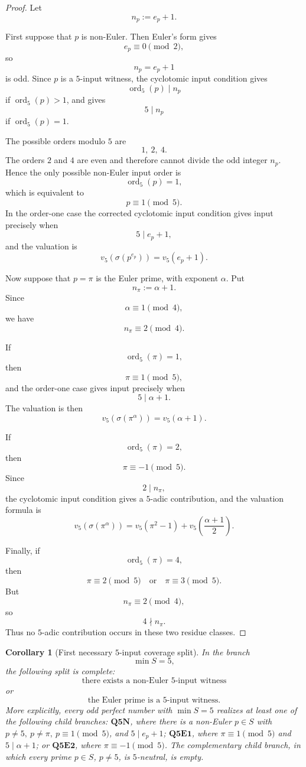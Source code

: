 \documentclass[11pt]{article}
\newtheorem{corollary}[theorem]{Corollary}
\theoremstyle{definition}
\theoremstyle{remark}
\DeclareMathOperator{\ord}{ord}
\begin{document}
\begin{proof}
Let
\[
  n_p:=e_p+1.
\]

First suppose that $p$ is non-Euler.  Then Euler's form gives
\[
  e_p\equiv0\pmod2,
\]
so
\[
  n_p=e_p+1
\]
is odd.  Since $p$ is a $5$-input witness, the cyclotomic input condition gives
\[
  \ord_5(p)\mid n_p
\]
if $\ord_5(p)>1$, and gives
\[
  5\mid n_p
\]
if $\ord_5(p)=1$.

The possible orders modulo $5$ are
\[
  1,\ 2,\ 4.
\]
The orders $2$ and $4$ are even and therefore cannot divide the odd integer
$n_p$.  Hence the only possible non-Euler input order is
\[
  \ord_5(p)=1,
\]
which is equivalent to
\[
  p\equiv1\pmod5.
\]
In the order-one case the corrected cyclotomic input condition gives input
precisely when
\[
  5\mid e_p+1,
\]
and the valuation is
\[
  v_5(\sigma(p^{e_p}))=v_5(e_p+1).
\]

Now suppose that $p=\pi$ is the Euler prime, with exponent $\alpha$.  Put
\[
  n_\pi:=\alpha+1.
\]
Since
\[
  \alpha\equiv1\pmod4,
\]
we have
\[
  n_\pi\equiv2\pmod4.
\]

If
\[
  \ord_5(\pi)=1,
\]
then
\[
  \pi\equiv1\pmod5,
\]
and the order-one case gives input precisely when
\[
  5\mid \alpha+1.
\]
The valuation is then
\[
  v_5(\sigma(\pi^\alpha))=v_5(\alpha+1).
\]

If
\[
  \ord_5(\pi)=2,
\]
then
\[
  \pi\equiv-1\pmod5.
\]
Since
\[
  2\mid n_\pi,
\]
the cyclotomic input condition gives a $5$-adic contribution, and the valuation
formula is
\[
  v_5(\sigma(\pi^\alpha))
  =
  v_5(\pi^2-1)
  +
  v_5\!\left(\frac{\alpha+1}{2}\right).
\]

Finally, if
\[
  \ord_5(\pi)=4,
\]
then
\[
  \pi\equiv2\pmod5
  \quad\text{or}\quad
  \pi\equiv3\pmod5.
\]
But
\[
  n_\pi\equiv2\pmod4,
\]
so
\[
  4\nmid n_\pi.
\]
Thus no $5$-adic contribution occurs in these two residue classes.
\end{proof}

\begin{corollary}[First necessary $5$-input coverage split]
\label{cor:q5-first-input-coverage-split}
In the branch
\[
  \min S=5,
\]
the following split is complete:
\[
  \text{there exists a non-Euler $5$-input witness}
\]
or
\[
  \text{the Euler prime is a $5$-input witness}.
\]
More explicitly, every odd perfect number with \(\min S=5\) realizes at least
one of the following child branches: \(\mathbf{Q5N}\), where there is a
non-Euler \(p\in S\) with \(p\ne5,\ p\ne\pi,\ p\equiv1\pmod5\), and
\(5\mid e_p+1\); \(\mathbf{Q5E1}\), where \(\pi\equiv1\pmod5\) and
\(5\mid\alpha+1\); or \(\mathbf{Q5E2}\), where \(\pi\equiv-1\pmod5\).  The
complementary child branch, in which every prime \(p\in S\), \(p\ne5\), is
\(5\)-neutral, is empty.
\end{corollary}
\end{document}
